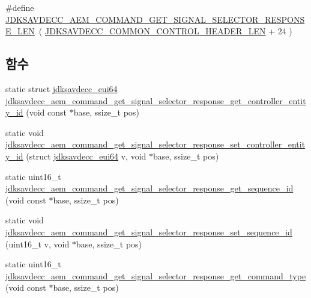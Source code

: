 \begin{DoxyCompactItemize}
\item 
\#define \hyperlink{group__command__get__signal__selector__response_ga4a41341e46b170f9678cd06cde61f1c9}{J\+D\+K\+S\+A\+V\+D\+E\+C\+C\+\_\+\+A\+E\+M\+\_\+\+C\+O\+M\+M\+A\+N\+D\+\_\+\+G\+E\+T\+\_\+\+S\+I\+G\+N\+A\+L\+\_\+\+S\+E\+L\+E\+C\+T\+O\+R\+\_\+\+R\+E\+S\+P\+O\+N\+S\+E\+\_\+\+L\+EN}~( \hyperlink{group__jdksavdecc__avtp__common__control__header_gaae84052886fb1bb42f3bc5f85b741dff}{J\+D\+K\+S\+A\+V\+D\+E\+C\+C\+\_\+\+C\+O\+M\+M\+O\+N\+\_\+\+C\+O\+N\+T\+R\+O\+L\+\_\+\+H\+E\+A\+D\+E\+R\+\_\+\+L\+EN} + 24 )
\end{DoxyCompactItemize}
\subsection*{함수}
\begin{DoxyCompactItemize}
\item 
static struct \hyperlink{structjdksavdecc__eui64}{jdksavdecc\+\_\+eui64} \hyperlink{group__command__get__signal__selector__response_ga56a8342a223d3598b2bf527e3a35769e}{jdksavdecc\+\_\+aem\+\_\+command\+\_\+get\+\_\+signal\+\_\+selector\+\_\+response\+\_\+get\+\_\+controller\+\_\+entity\+\_\+id} (void const $\ast$base, ssize\+\_\+t pos)
\item 
static void \hyperlink{group__command__get__signal__selector__response_ga0159548f1ed3a2930d1e7c3277753147}{jdksavdecc\+\_\+aem\+\_\+command\+\_\+get\+\_\+signal\+\_\+selector\+\_\+response\+\_\+set\+\_\+controller\+\_\+entity\+\_\+id} (struct \hyperlink{structjdksavdecc__eui64}{jdksavdecc\+\_\+eui64} v, void $\ast$base, ssize\+\_\+t pos)
\item 
static uint16\+\_\+t \hyperlink{group__command__get__signal__selector__response_ga7d1d68fef82f0eeba84a2ce108497c99}{jdksavdecc\+\_\+aem\+\_\+command\+\_\+get\+\_\+signal\+\_\+selector\+\_\+response\+\_\+get\+\_\+sequence\+\_\+id} (void const $\ast$base, ssize\+\_\+t pos)
\item 
static void \hyperlink{group__command__get__signal__selector__response_ga47555be4bd3164f4f0927fe556240fbc}{jdksavdecc\+\_\+aem\+\_\+command\+\_\+get\+\_\+signal\+\_\+selector\+\_\+response\+\_\+set\+\_\+sequence\+\_\+id} (uint16\+\_\+t v, void $\ast$base, ssize\+\_\+t pos)
\item 
static uint16\+\_\+t \hyperlink{group__command__get__signal__selector__response_gaa8b413b289f9814bb8a6013b7691a7d0}{jdksavdecc\+\_\+aem\+\_\+command\+\_\+get\+\_\+signal\+\_\+selector\+\_\+response\+\_\+get\+\_\+command\+\_\+type} (void const $\ast$base, ssize\+\_\+t pos)

\end{DoxyCompactItemize}
